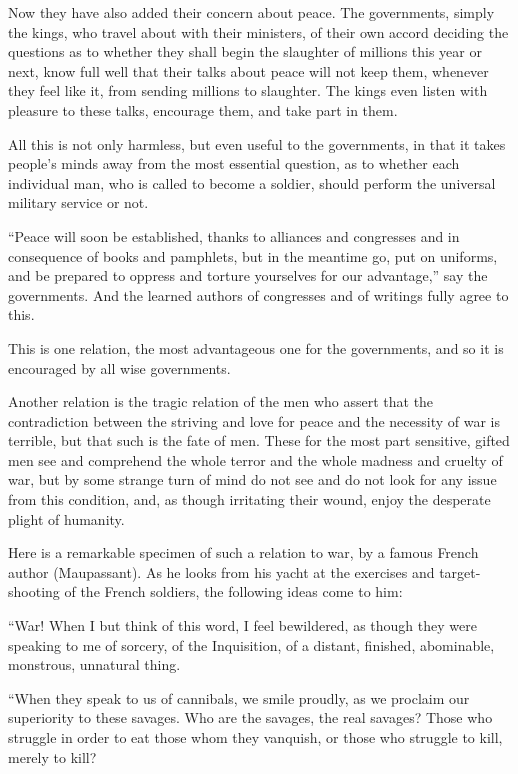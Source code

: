 \documentclass{book}
\begin{document}
Now they have also added their concern about peace. The governments, simply the kings, who travel about with their ministers, of their own accord deciding the questions as to whether they shall begin the slaughter of millions this year or next, know full well that their talks about peace will not keep them, whenever they feel like it, from sending millions to slaughter. The kings even listen with pleasure to these talks, encourage them, and take part in them.

All this is not only harmless, but even useful to the governments, in that it takes people’s minds away from the most essential question, as to whether each individual man, who is called to become a soldier, should perform the universal military service or not.

“Peace will soon be established, thanks to alliances and congresses and in consequence of books and pamphlets, but in the meantime go, put on uniforms, and be prepared to oppress and torture yourselves for our advantage,” say the governments. And the learned authors of congresses and of writings fully agree to this.

This is one relation, the most advantageous one for the governments, and so it is encouraged by all wise governments.

Another relation is the tragic relation of the men who assert that the contradiction between the striving and love for peace and the necessity of war is terrible, but that such is the fate of men. These for the most part sensitive, gifted men see and comprehend the whole terror and the whole madness and cruelty of war, but by some strange turn of mind do not see and do not look for any issue from this condition, and, as though irritating their wound, enjoy the desperate plight of humanity.

Here is a remarkable specimen of such a relation to war, by a famous French author (Maupassant). As he looks from his yacht at the exercises and target-shooting of the French soldiers, the following ideas come to him:

“War! When I but think of this word, I feel bewildered, as though they were speaking to me of sorcery, of the Inquisition, of a distant, finished, abominable, monstrous, unnatural thing.

“When they speak to us of cannibals, we smile proudly, as we proclaim our superiority to these savages. Who are the savages, the real savages? Those who struggle in order to eat those whom they vanquish, or those who struggle to kill, merely to kill?
\end{document}
